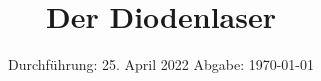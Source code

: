 

\subject{V60}
\title{Der Diodenlaser}
\date{%
  Durchführung: 25. April 2022
  \hspace{3em}
  Abgabe: \today
}



\maketitle
\thispagestyle{empty}
\tableofcontents
\newpage








\nocite{matplotlib}
\nocite{scipy}
\nocite{numpy}
\nocite{uncertainties}

\newpage
\printbibliography{}


